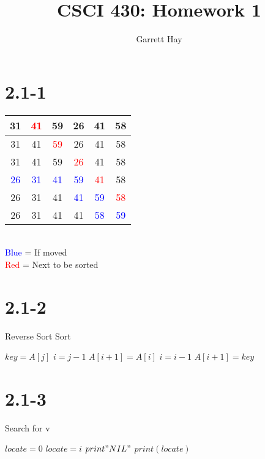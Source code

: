 \documentclass[12pt]{article}
\author{Garrett Hay}
\title{CSCI 430: Homework 1}
\begin{document}
\maketitle

\section*{2.1-1}
\noindent    
\begin{tabular}{| c | c | c | c | c | c |}
      \hline
      31 & \textcolor{red}{41} & 59 & 26 & 41 & 58 \\
      \hline
      31 & 41 & \textcolor{red}{59} & 26 & 41 & 58 \\
      \hline
      31 & 41 & 59 & \textcolor{red}{26} & 41 & 58 \\
      \hline
      \textcolor{blue}{26} & \textcolor{blue}{31} & \textcolor{blue}{41}
      	& \textcolor{blue}{59} & \textcolor{red}{41} & 58 \\
      \hline
      26 & 31 & 41 & \textcolor{blue}{41} & \textcolor{blue}{59}
      	& \textcolor{red}{58} \\
      \hline
      26 & 31 & 41 & 41 & \textcolor{blue}{58} & \textcolor{blue}{59} \\
      \hline
\end{tabular}
\\ \textcolor{blue}{Blue} = If moved\\
\textcolor{red}{Red} = Next to be sorted
    
\section*{2.1-2}
\begin{algorithm}
\caption{Reverse Sort Sort}
\begin{algorithmic}
	\STATE $ key = A[j] $
   	\STATE $ i = j-1 $
   		\STATE $ A[i+1] = A[i] $
   		\STATE $ i = i-1 $
   	\ENDWHILE
   	\STATE $ A[i+1] = key $
\ENDFOR
\end{algorithmic}
\end{algorithm}

\newpage
\section*{2.1-3}
\noindent
\begin{algorithm}
\caption{Search for v}
\begin{algorithmic}
\STATE $locate = 0$
   		\STATE $locate = i$
   	\ENDIF
\ENDFOR
{}
   	\STATE $print "NIL"$
\ELSE
   	\STATE $print(locate)$
\ENDIF
\end{algorithmic}
\end{algorithm}
\end{document}
